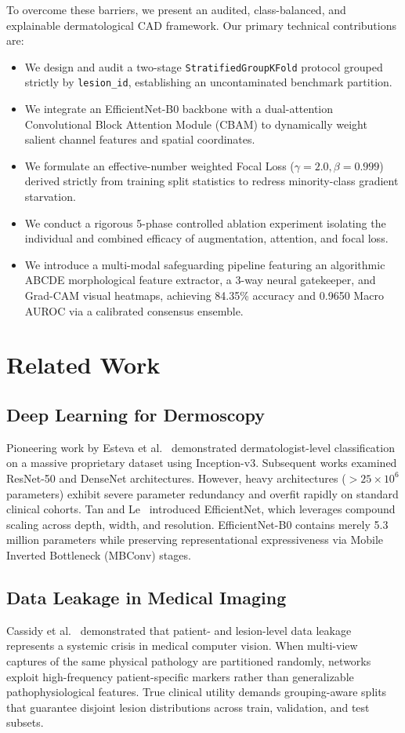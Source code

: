 \documentclass[conference]{IEEEtran}
\begin{document}
To overcome these barriers, we present an audited, class-balanced, and explainable dermatological CAD framework. Our primary technical contributions are:
\begin{itemize}
    \item We design and audit a two-stage \texttt{StratifiedGroupKFold} protocol grouped strictly by \texttt{lesion\_id}, establishing an uncontaminated benchmark partition.
    \item We integrate an EfficientNet-B0 backbone with a dual-attention Convolutional Block Attention Module (CBAM) to dynamically weight salient channel features and spatial coordinates.
    \item We formulate an effective-number weighted Focal Loss ($\gamma=2.0, \beta=0.999$) derived strictly from training split statistics to redress minority-class gradient starvation.
    \item We conduct a rigorous 5-phase controlled ablation experiment isolating the individual and combined efficacy of augmentation, attention, and focal loss.
    \item We introduce a multi-modal safeguarding pipeline featuring an algorithmic ABCDE morphological feature extractor, a 3-way neural gatekeeper, and Grad-CAM visual heatmaps, achieving 84.35\% accuracy and 0.9650 Macro AUROC via a calibrated consensus ensemble.
\end{itemize}

\section{Related Work}
\subsection{Deep Learning for Dermoscopy}
Pioneering work by Esteva et al.~\cite{esteva2017} demonstrated dermatologist-level classification on a massive proprietary dataset using Inception-v3. Subsequent works examined ResNet-50 and DenseNet architectures. However, heavy architectures ($>25\times 10^6$ parameters) exhibit severe parameter redundancy and overfit rapidly on standard clinical cohorts. Tan and Le~\cite{tan2019} introduced EfficientNet, which leverages compound scaling across depth, width, and resolution. EfficientNet-B0 contains merely 5.3 million parameters while preserving representational expressiveness via Mobile Inverted Bottleneck (MBConv) stages.

\subsection{Data Leakage in Medical Imaging}
Cassidy et al.~\cite{cassidy2022} demonstrated that patient- and lesion-level data leakage represents a systemic crisis in medical computer vision. When multi-view captures of the same physical pathology are partitioned randomly, networks exploit high-frequency patient-specific markers rather than generalizable pathophysiological features. True clinical utility demands grouping-aware splits that guarantee disjoint lesion distributions across train, validation, and test subsets.
\end{document}
